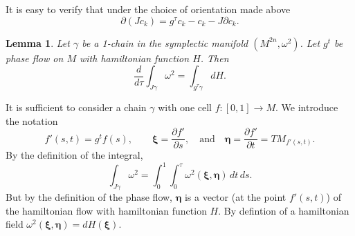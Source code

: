 \documentclass{book}
\numberwithin{equation}{section}
\theoremstyle{plain}
\newtheorem*{lem*}{Lemma}
\let\oldendproof\endproof
\renewenvironment{proof}[1][\proofname]{%
  \oldproof[\textsc{#1}]%
}{\oldendproof}
\theoremstyle{definition}
\theoremstyle{remark}
\theoremstyle{smallcap}
\numberwithin{prob}{section}
\begin{document}
It is easy to verify that under the choice of orientation made above
\begin{equation}
\partial (J c_k) = g^\tau c_k - c_k - J \partial c_k.
\label{eq:c_homotopy}
\end{equation}

\begin{lem*}
  Let $\gamma$ be a 1-chain in the symplectic manifold $(M^{2n}, \omega^2)$.
  Let $g^t$ be phase flow on $M$ with hamiltonian function $H$.
  Then
  $$
  \frac{d}{d\tau} \int_{J\gamma} \omega^2
  =
  \int_{g^\tau\gamma} dH.
  $$
\end{lem*}

\begin{proof}
  It is sufficient to consider a chain $\gamma$ with one cell
  $f: [0,1] \rightarrow M$.
  We introduce the notation
  $$
    f'(s, t) = g^t f(s),
    \qquad
    \pmb\xi = \frac{ \partial f' } { \partial s },
    \mathrm{\quad and \quad}
    \pmb\eta = \frac{ \partial f' } { \partial t }
    = TM_{f'(s, t)}.
  $$
  By the definition of the integral,
  $$
  \int_{J\gamma} \omega^2
  =
  \int_0^1 \int_0^\tau \omega^2(\pmb\xi, \pmb\eta) \, dt \, ds.
  $$
  But by the definition of the phase flow,
  $\pmb \eta$ is a vector (at the point $f'(s, t)$)
  of the hamiltonian flow with hamiltonian function $H$.
  By defintion of a hamiltonian field
  $\omega^2(\pmb\xi, \pmb\eta) = dH(\pmb\xi)$.
  \begin{figure*}
    \centering
\end{figure*}
\end{proof}
\end{document}
